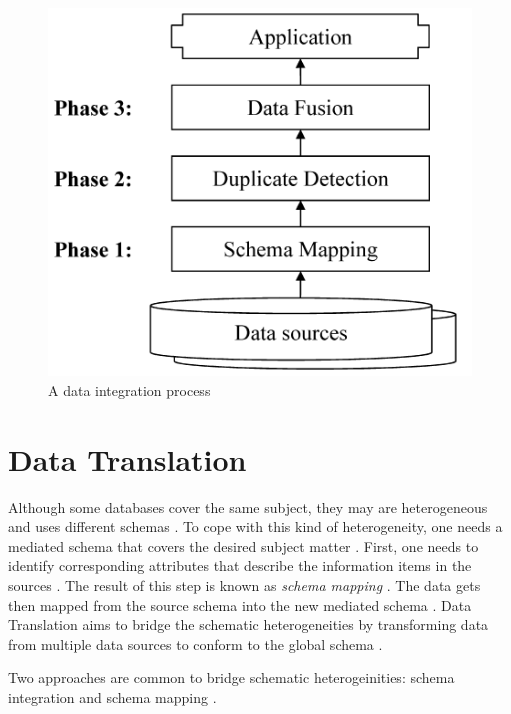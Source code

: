 \begin{figure}
	\begin{center}
	\includegraphics[width=13cm]{./figures/dataIntegrationProcess.PNG}
	\caption[A data integration process]{A data integration process \cite{Bleiholder2009DataF}}
	\label{fig:data-integration-process}
	\end{center}
\end{figure}

\section{Data Translation}

Although some databases cover the same subject, they may are heterogeneous and uses different schemas \cite{Bernstein2008InformationII}. 
To cope with this kind of heterogeneity, one needs a mediated schema that covers the desired subject matter \cite{Bernstein2008InformationII}. 
First, one needs to identify corresponding attributes that describe the information items in the sources \cite{Bleiholder2009DataF}. 
The result of this step is known as \textit{schema mapping} \cite{Bleiholder2009DataF}. 
The data gets then mapped from the source schema into the new mediated schema \cite{Bernstein2008InformationII}.
Data Translation aims to bridge the schematic heterogeneities by transforming data from multiple data sources to conform to the global schema \cite{Bleiholder2009DataF}.

Two approaches are common to bridge schematic heterogeinities: schema integration and schema mapping \cite{Bleiholder2009DataF}.

